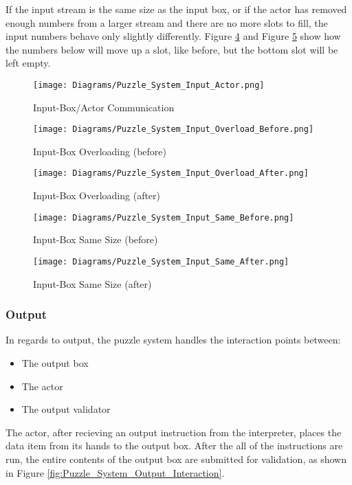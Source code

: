 If the input stream is the same size as the input box, or if the actor has removed
enough numbers from a larger stream and there are no more slots to fill, the input numbers
behave only slightly differently. Figure \ref{fig:Puzzle_System_Input_Same_Before}
and Figure \ref{fig:Puzzle_System_Input_Same_After} show how the numbers below will move up a slot, like before,
but the bottom slot will be left empty.\\

\begin{figure}[!hb]
  \caption{Input-Box/Actor Communication}
  \label{fig:Puzzle_System_Input_Actor}
  \centering
  \texttt{[image: Diagrams/Puzzle\_System\_Input\_Actor.png]}
\end{figure}

\begin{figure}[!hb]
  \caption{Input-Box Overloading (before)}
  \label{fig:Puzzle_System_Input_Overload_Before}
  \centering
  \texttt{[image: Diagrams/Puzzle\_System\_Input\_Overload\_Before.png]}
\end{figure}

\begin{figure}[!hb]
  \caption{Input-Box Overloading (after)}
  \label{fig:Puzzle_System_Input_Overload_After}
  \centering
  \texttt{[image: Diagrams/Puzzle\_System\_Input\_Overload\_After.png]}
\end{figure}
\vfill
\clearpage

\begin{figure}[!hb]
  \caption{Input-Box Same Size (before)}
  \label{fig:Puzzle_System_Input_Same_Before}
  \centering
  \texttt{[image: Diagrams/Puzzle\_System\_Input\_Same\_Before.png]}
\end{figure}

\begin{figure}[!hb]
  \caption{Input-Box Same Size (after)}
  \label{fig:Puzzle_System_Input_Same_After}
  \centering
  \texttt{[image: Diagrams/Puzzle\_System\_Input\_Same\_After.png]}
\end{figure}
\vfill
\clearpage

\subsubsection{Output}
In regards to output, the puzzle system handles the interaction points between:
\begin{itemize}
  \item The output box
  \item The actor
  \item The output validator
\end{itemize}
The actor, after recieving an output instruction from the interpreter, places the
data item from its hands to the output box. After the all of the instructions are run, the
entire contents of the output box are submitted for validation, as shown in Figure
\ref{fig:Puzzle_System_Output_Interaction}.\\

